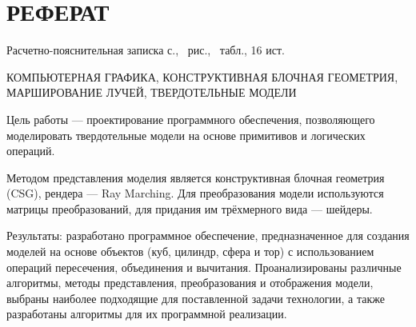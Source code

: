 \section*{РЕФЕРАТ}

Расчетно-пояснительная записка \pageref{LastPage} с., \totalfigures\ рис., \totaltables\ табл., 16 ист.

КОМПЬЮТЕРНАЯ ГРАФИКА, КОНСТРУКТИВНАЯ БЛОЧНАЯ ГЕОМЕТРИЯ, МАРШИРОВАНИЕ ЛУЧЕЙ, ТВЕРДОТЕЛЬНЫЕ МОДЕЛИ

Цель работы --- проектирование программного обеспечения, позволяющего моделировать твердотельные модели на основе примитивов и логических операций. 

Методом представления моделия является  конструктивная  блочная геометрия  (CSG), 
рендера  ---  Ray Marching.
Для  преобразования  модели  используются
матрицы преобразований, для придания им трёхмерного вида --- шейдеры.

Результаты: разработано программное обеспечение, предназначенное для создания моделей на основе объектов (куб, цилиндр, сфера и тор) с использованием операций пересечения, объединения и 
вычитания.  
Проанализированы  различные  алгоритмы,  методы  представления, 
преобразования  и  отображения  модели,  выбраны  наиболее  подходящие  для поставленной  задачи  технологии,  а  также  разработаны  алгоритмы  для  их 
программной реализации. 

\pagebreak